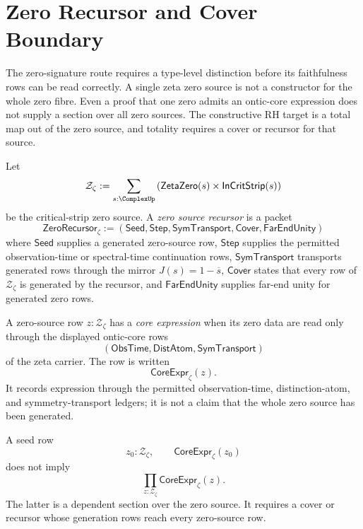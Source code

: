 \section{Zero Recursor and Cover Boundary}
\label{sec:unified-reality-zero-recursor-cover-boundary}

The zero-signature route requires a type-level distinction before its
faithfulness rows can be read correctly.  A single zeta zero source is
not a constructor for the whole zero fibre.  Even a proof that one zero
admits an ontic-core expression does not supply a section over all zero
sources.  The constructive RH target is a total map out of the zero
source, and totality requires a cover or recursor for that source.

\begin{definition}
\label{def:unified-reality-zero-source-recursor}
Let
$$
\mathcal Z_{\zeta}
:=
\sum_{s:\ComplexUp}
\left(
\mathsf{ZetaZero}(s)\times\mathsf{InCritStrip}(s)
\right)
$$
be the critical-strip zero source.  A \emph{zero source recursor} is a
packet
$$
\mathsf{ZeroRecursor}_{\zeta}
:=
(
\mathsf{Seed},
\mathsf{Step},
\mathsf{SymTransport},
\mathsf{Cover},
\mathsf{FarEndUnity}
)
$$
where $\mathsf{Seed}$ supplies a generated zero-source row,
$\mathsf{Step}$ supplies the permitted observation-time or spectral-time
continuation rows, $\mathsf{SymTransport}$ transports generated rows
through the mirror $J(s)=1-\overline{s}$, $\mathsf{Cover}$ states that
every row of $\mathcal Z_{\zeta}$ is generated by the recursor, and
$\mathsf{FarEndUnity}$ supplies far-end unity for generated zero rows.
\end{definition}

\begin{definition}
\label{def:unified-reality-zero-core-expression}
A zero-source row $z:\mathcal Z_{\zeta}$ has a \emph{core expression}
when its zero data are read only through the displayed ontic-core rows
$$
(\mathsf{ObsTime},\mathsf{DistAtom},\mathsf{SymTransport})
$$
of the zeta carrier.  The row is written
$$
\mathsf{CoreExpr}_{\zeta}(z).
$$
It records expression through the permitted observation-time,
distinction-atom, and symmetry-transport ledgers; it is not a claim that
the whole zero source has been generated.
\end{definition}

\begin{principle}
\label{prin:unified-reality-seed-expression-not-zero-source-construction}
A seed row
$$
z_0:\mathcal Z_{\zeta},
\qquad
\mathsf{CoreExpr}_{\zeta}(z_0)
$$
does not imply
$$
\prod_{z:\mathcal Z_{\zeta}}
\mathsf{CoreExpr}_{\zeta}(z).
$$
The latter is a dependent section over the zero source.  It requires a
cover or recursor whose generation rows reach every zero-source row.
\end{principle}

